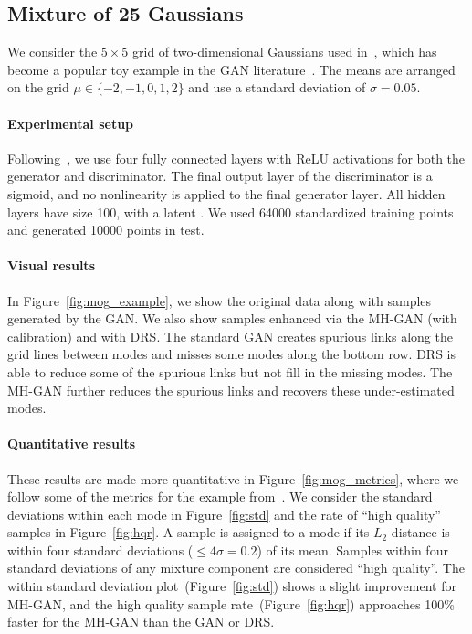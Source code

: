 \documentclass{article}
\renewcommand{\vec}[1]{{\boldsymbol{\mathbf{#1}}}} %
\newcommand{\R}{\mathbb{R}}
\begin{document}
\subsection{Mixture of 25 Gaussians}

We consider the $5 \times 5$ grid of two-dimensional Gaussians used in~\citet{Azadi2018}, which has become a popular toy example in the GAN literature~\citep{Dumoulin2016}.
The means are arranged on the grid $\mu \in \{{-2},{-1},0,1,2\}$ and use a standard deviation of $\sigma = 0.05$.

\paragraph{Experimental setup}
Following~\citet{Azadi2018}, we use four fully connected layers with ReLU activations for both the generator and discriminator.
The final output layer of the discriminator is a sigmoid, and no nonlinearity is applied to the final generator layer.
All hidden layers have size 100, with a latent \smash{$\vec z \in \R^2$}.
We used \num{64000} standardized training points and generated \num{10000} points in test.

\paragraph{Visual results}
In Figure~\ref{fig:mog_example}, we show the original data along with samples generated by the GAN\@.
We also show samples enhanced via the MH-GAN (with calibration) and with DRS\@.
The standard GAN creates spurious links along the grid lines between modes and misses some modes along the bottom row.
DRS is able to reduce some of the spurious links but not fill in the missing modes.
The MH-GAN further reduces the spurious links and recovers these under-estimated modes.

\paragraph{Quantitative results}
These results are made more quantitative in Figure~\ref{fig:mog_metrics}, where we follow some of the metrics for the example from~\citet{Azadi2018}.
We consider the standard deviations within each mode in Figure~\ref{fig:std} and the rate of ``high quality'' samples in Figure~\ref{fig:hqr}.
A sample is assigned to a mode if its $L_2$ distance is within four standard deviations ($\leq 4 \sigma = 0.2$) of its mean.
Samples within four standard deviations of any mixture component are considered ``high quality''.
The within standard deviation plot~(Figure~\ref{fig:std}) shows a slight improvement for MH-GAN, and the high quality sample rate~(Figure~\ref{fig:hqr}) approaches 100\% faster for the MH-GAN than the GAN or DRS\@.
\end{document}
